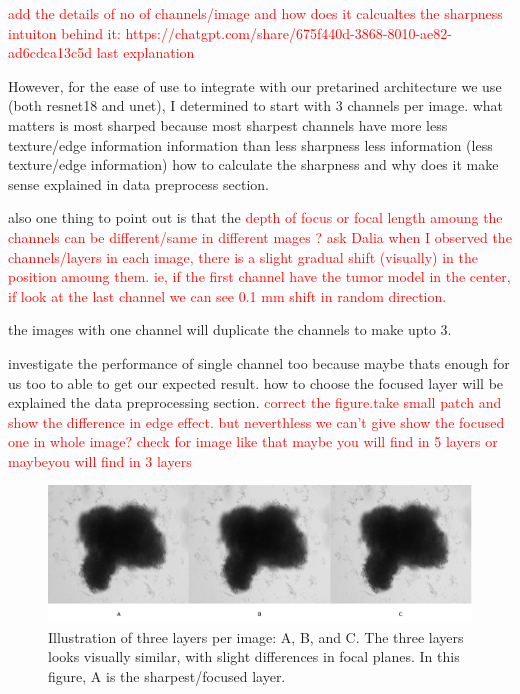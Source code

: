   \textcolor{red}{add the details of no of channels/image and how does it calcualtes the sharpness intuiton behind it: https://chatgpt.com/share/675f440d-3868-8010-ae82-ad6cdca13c5d last explanation}

  However, for the ease of use to integrate with our pretarined architecture we use (both resnet18 and unet),
  I determined to start with 3 channels per image. 
what matters is  most sharped because 
  most sharpest channels have more less texture/edge information information than less sharpness 
 less information (less texture/edge information) 
  how to calculate the sharpness and why does it make sense explained in data preprocess section.

  also one thing to point out is that the   \textcolor{red}{depth of focus or focal length amoung the channels can be different/same in different mages ? ask Dalia}
  \textcolor{red}{when I observed the channels/layers in each image, there is a slight gradual shift (visually) in the position amoung them. ie, if the first channel
   have the tumor model in the center, if look at the last channel we can see 0.1 mm shift in random direction.} 

  the images with one channel will duplicate the channels to make upto 3.
  
 
  investigate the performance of single channel too because maybe thats enough for us too to able to get our expected result.
  how to choose the focused layer will be explained the data preprocessing section.
  \textcolor{red}{correct the figure.take small patch and show the difference in edge effect. but neverthless we can't 
  give show the focused one in whole image? check for image like that maybe you will find in 5 layers or maybeyou will find in 3 layers}
\begin{figure}[H]
  \centering
  \includegraphics[scale=0.46]{figures/threes.png} 
  \caption{Illustration of three layers per image: A, B, and C. The three layers looks visually similar, with slight differences in focal planes. In this figure, A is the sharpest/focused layer.}
  \label{fig:Threes}
\end{figure}

